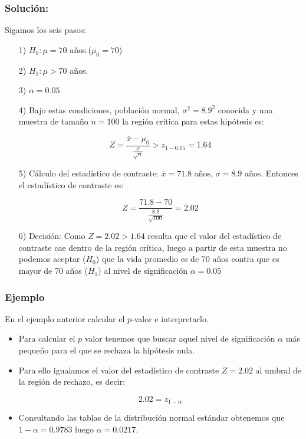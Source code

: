 \begin{frame}
     \frametitle{Solución:}
  Sigamos los seis pasos:
 \begin{itemize}
\item[1)] $H_{0}:\mu=70$ años.($\mu_{0}=70$)  
\item[2)] $H_{1}:\mu>70$ años.  
\item[3)] $\alpha=0.05$  
\item[4)] Bajo estas condiciones, población normal, $\sigma^2=8.9^2$ conocida
 y una muestra de tamaño $n=100$ la región crítica para estas
 hipótesis es:

 $$Z=\frac{\overline{x}-\mu_{0}}{\frac{\sigma}{\sqrt{n}}}>z_{1-0.05}=1.64$$
\end{itemize}
\end{frame}

\begin{frame}
\begin{itemize}
\item[5)] Cálculo del estadístico de contraste:
 $\overline{x}=71.8$ años, $\sigma=8.9$ años. Entonces el estadístico
 de contraste es:

 $$Z=\frac{71.8-70}{\frac{8.9}{\sqrt{100}}}=2.02$$

\item[6)] Decisión: Como $Z=2.02>1.64$ resulta que el valor del estadístico
 de contraste cae dentro de la región crítica, luego  a partir de esta
 muestra no podemos
 aceptar ($H_{0}$) que la vida promedio es de 70 años contra que es
 mayor de 70 años ($H_{1}$) al nivel de significación $\alpha=0.05$
\end{itemize}
\end{frame}

\begin{frame}
\frametitle{Ejemplo}
En el ejemplo anterior calcular el $p$-valor e interpretarlo.
\begin{itemize}
\item  Para calcular el $p$ valor tenemos que buscar aquel nivel de
significación $\alpha$ más pequeño para el que se rechaza la
hipótesis nula.
\item Para ello igualamos el valor del estadístico de contraste $Z=2.02$
al umbral de la región de rechazo, es decir:

    $$2.02=z_{1-\alpha}$$

\item Consultando las tablas de la  distribución normal estándar obtenemos que
    $1-\alpha=0.9783$ luego $\alpha=0.0217$.
\end{itemize}
\end{frame}

